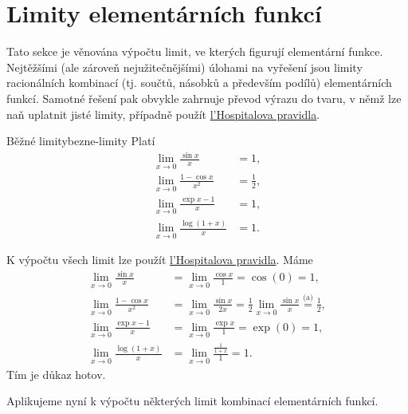 \section{Limity elementárních funkcí}
\label{sec:limity-elementarnich-funkci}

Tato sekce je věnována výpočtu limit, ve kterých figurují elementární funkce.
Nejtěžšími (ale zároveň nejužitečnějšími) úlohami na vyřešení jsou limity
racionálních kombinací (tj. součtů, násobků a především podílů) elementárních
funkcí. Samotné řešení pak obvykle zahrnuje převod výrazu do tvaru, v němž lze
naň uplatnit jisté  limity, případně použít
\hyperref[thm:lhospitalovo-pravidlo]{l'Hospitalova pravidla}.

\begin{proposition}{Běžné limity}{bezne-limity}
 Platí
 \begingroup
 \addtolength{\jot}{3mm}
 \begin{align}
  \lim_{x \to 0} \frac{\sin x}{x} &= 1,\tag{a}\\
  \lim_{x \to 0} \frac{1-\cos x}{x^2} &= \frac{1}{2},\tag{b}\\
  \lim_{x \to 0} \frac{\exp x - 1}{x} &= 1,\tag{c}\\
  \lim_{x \to 0} \frac{\log(1+x)}{x} &= 1.\tag{d}
 \end{align}
 \endgroup
\end{proposition}
\begin{propproof}
 K výpočtu všech limit lze použít
 \hyperref[thm:lhospitalovo-pravidlo]{l'Hospitalova pravidla}. Máme
 \begingroup
 \addtolength{\jot}{3mm}
 \begin{align}
  \lim_{x \to 0} \frac{\sin x}{x} &= \lim_{x \to 0} \frac{\cos x}{1} = \cos(0) =
  1,\tag{a}\\
  \lim_{x \to 0} \frac{1-\cos x}{x^2} &= \lim_{x \to 0} \frac{\sin x}{2x} =
  \frac{1}{2} \lim_{x \to 0} \frac{\sin x}{x} \overset{\text{(a)}}{=}
  \frac{1}{2},\tag{b}\\
  \lim_{x \to 0} \frac{\exp x - 1}{x} &= \lim_{x \to 0} \frac{\exp x}{1} =
  \exp(0) = 1,\tag{c}\\
  \lim_{x \to 0} \frac{\log(1+x)}{x} &= \lim_{x \to 0} \frac{\frac{1}{1+x}}{1} =
  1.\tag{d}
 \end{align}
 \endgroup
 Tím je důkaz hotov.
\end{propproof}

Aplikujeme nyní  k výpočtu některých limit
kombinací elementárních funkcí.

